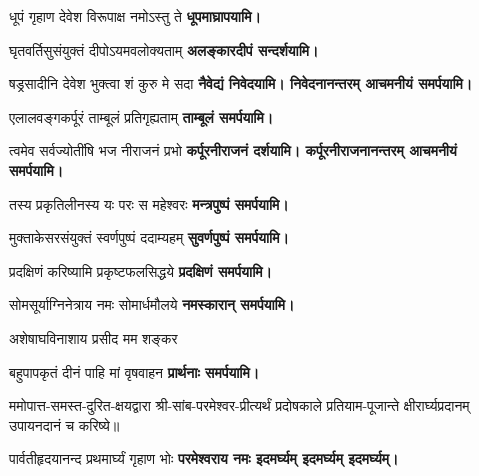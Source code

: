 \begin{center}

{धूपं गृहाण देवेश विरूपाक्ष नमोऽस्तु ते}
\textbf{\devAya{} धूपमाघ्रापयामि।}
\medskip

{घृतवर्तिसुसंयुक्तं दीपोऽयमवलोक्यताम्}
\textbf{\devAya{} अलङ्कारदीपं सन्दर्शयामि।}
\medskip

{षड्रसादीनि देवेश भुक्त्वा शं कुरु मे सदा}
\textbf{\devAya{} नैवेद्यं निवेदयामि। निवेदनानन्तरम् आचमनीयं समर्पयामि।}
\medskip

{एलालवङ्गकर्पूरं ताम्बूलं प्रतिगृह्यताम्}
\textbf{\devAya{} ताम्बूलं समर्पयामि।}
\medskip

{त्वमेव सर्वज्योतींषि भज नीराजनं प्रभो}
\textbf{\devAya{} कर्पूरनीराजनं दर्शयामि। कर्पूरनीराजनानन्तरम् आचमनीयं समर्पयामि।}
\medskip

{तस्य प्रकृतिलीनस्य यः परः स महेश्वरः}
\textbf{\devAya{} मन्त्रपुष्पं समर्पयामि।}
\medskip

{मुक्ताकेसरसंयुक्तं स्वर्णपुष्पं ददाम्यहम्}
\textbf{\devAya{} सुवर्णपुष्पं समर्पयामि।}
\medskip

{प्रदक्षिणं करिष्यामि प्रकृष्टफलसिद्धये}
\textbf{\devAya{} प्रदक्षिणं समर्पयामि।}
\medskip

{सोमसूर्याग्निनेत्राय नमः सोमार्धमौलये}
\textbf{\devAya{} नमस्कारान् समर्पयामि।}
\medskip

{अशेषाघविनाशाय प्रसीद मम शङ्कर}

{बहुपापकृतं दीनं पाहि मां वृषवाहन}
\textbf{\devAya{} प्रार्थनाः समर्पयामि।}

\end{center}


ममोपात्त-समस्त-दुरित-क्षयद्वारा श्री-सांब-परमेश्वर-प्रीत्यर्थं प्रदोषकाले प्रतियाम-पूजान्ते
क्षीरार्घ्यप्रदानम् उपायनदानं च करिष्ये॥

{पार्वतीहृदयानन्द प्रथमार्घ्यं गृहाण भोः}
\textbf{परमेश्वराय नमः इदमर्घ्यम् इदमर्घ्यम् इदमर्घ्यम्।}

